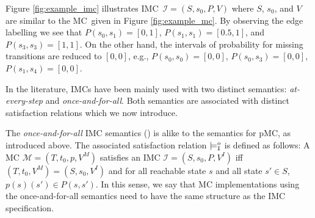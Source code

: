 \documentclass{llncs}
\newcommand{\mc}{\textnormal{MC}}
\newcommand{\imc}{\textnormal{IMC}}
\newcommand{\pmc}{\textnormal{pMC}}
\newcommand{\satisfactionImcOnce}{\ensuremath{\models^{o}_{\tt{I}}}}
\begin{document}
\begin{example}\label{ex:imc}
Figure \ref{fig:example_imc} illustrates \imc\ $\mathcal{I} = (S, s_0, P, V)$ where
$S$, $s_0$, and $V$ are similar to the \mc\ given in Figure \ref{fig:example_mc}.
By observing the edge labelling
we see that $P(s_0,s_1)=[0,1]$, $P(s_1,s_1)=[0.5,1]$, and $P(s_3,s_3)=[1, 1]$.
On the other hand, the intervals of probability for missing transitions are reduced to $[0,0]$, e.g., $P(s_0,s_0)=[0,0]$, $P(s_0,s_3)=[0,0]$, $P(s_1,s_4)=[0,0]$.
\end{example}


In the literature, {\imc}s have been mainly used with two distinct
semantics: {\em at-every-step} and {\em once-and-for-all}. Both
semantics are associated with distinct satisfaction relations which we
now introduce.

The {\em once-and-for-all} {\imc} semantics (\cite{Prophesy,tulip,puggelli13}) is alike to the semantics for \pmc, as
introduced above. The associated satisfaction relation
$\satisfactionImcOnce$ is defined as follows: A {\mc} $\mathcal{M} =
(T, t_0, p, V^M)$ satisfies an {\imc} $\mathcal{I} =
(S,s_0,P,V^I)$ iff $(T,t_0,V^M) = (S,s_0,V^I)$ and for all
reachable state $s$ and all state $s' \in S$, $p(s)(s') \in
P(s,s')$. In this sense, we say that {\mc} implementations using the
once-and-for-all semantics need to have the same structure as the
{\imc} specification.
\end{document}
